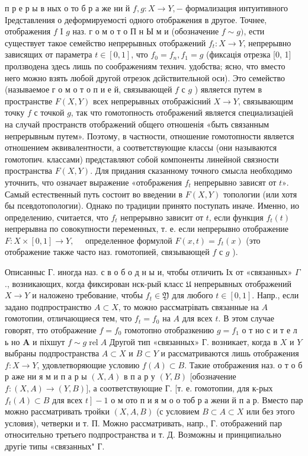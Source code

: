 \documentclass[10pt]{article}
\begin{document}
п р е р ы в ных о то б р а же ни й $f, g: X \rightarrow Y,-$ формализация интуитивного Іредставления о деформируемості одного отображения в другое. Точнее, отображения $f$ I $g$ наз. г о м о т $о$ П н Ы м и (обозначение $f \sim g)$, ести существует такое семейство непрерывных отображений $f_{t}: X \rightarrow Y$, непрерывно зависящих от параметра $t \in[0,1]$, что $f_{0}=f_{n}, f_{1}=g$ (фиксація отрезка [0, 1] пролзводена здесь лишь по соображениям технич. удобства; ясно, что вместо него можно взять любой другой отрезок дсйствительной оси). Это семейство (называемое г о м о т о п и е й, связывающей $f$ с $g$ ) является путем в пространстве $F(X, Y)$ всех непрерывных отображісний $X \rightarrow Y$, связывающим точку $f$ с точкой $g$, так что гомотопность отображений является специализаціей на случай пространств отображений общего отношенія «быть связанным непрерывным путем». Поэтому, в частности, отношение гомотопности является отношением әквивалентности, а соответствующие классы (они называются гомотопич. классами) представляют собой компоненты линейной связности пространства $F(X, Y)$. Для придания сказанному точного смысла необходимо уточнить, что означает выражение «отображения $f_{t}$ непрерывно зависят от $t »$. Самый естественный путь состоит во введении в $F(X, Y)$ топологии (или хотя бы псевдотопологии). Однако по традиции принято поступать иначе. Именно, ио определению, считается, что $f_{t}$ непрерывно зависит от $t$, если функция $f_{t}(t)$ непрерывна по совокупности переменных, т. е. если непрерывно отображение $F: X \times[0,1] \rightarrow Y, \quad$ определенное формулой $F(x, t)=f_{t}(x)$ (это отображение также часто наз. гомотопией, связывающей $f$ с $g$ ).



Описанныс Г. иногда наз. с в о б о д н ы и, чтобы отличить Іх от «связанных» $\Gamma$., возникающих, когда фиксирован нск-рый класс $\mathfrak{U}$ непрерывных отображений $X \rightarrow Y$ и наложено требование, чтобы $f_{t} \in \mathfrak{Y}$ для любого $t \in[0,1]$. Напр., если задано подпространство $A \subset X$, то можно рассматрівать связанные на $A$ гомотопии, отличающиеся тем, что $f_{t}=f_{0}$ на $A$ для всех $t$. В этом случае говорят, тто отображение $f=f_{0}$ гомотопно отобразкению $g=f_{1}$ о т но с и т е л ь но $\boldsymbol{A}$ и піхшут $f \sim g \operatorname{rel} A$ Другой тип «связанных» $Г$. возникает, когда в $X$ и $Y$ выбраны подпространства $A \subset X$ и $B \subset Y$ и рассматриваются лишь отображения $f: X \rightarrow Y$, удовлетворяющие условию $f(A) \subset B$. Такие отображения наз. о т о б р аже ни я м и п а р ы $(X, A)$ в п а р у $(Y, B)$ [обозначение $f:(X, A) \rightarrow(Y, B)]$, а соответствующие Г. [т. е. гомотопии, для к-рых $f_{t}(A) \subset B$ для всех $\left.t\right]-1$ о м ото п и я м о о тоб р а жени й п а р. Вместо пар можно рассматривать тройки $(X, A, B)$ (с условием $B \subset A \subset X$ или без этого условия), четверки и т. П. Можно рассматривать, напр., Г. отображений пар относительно третьего подпространства и т. Д. Возможны и принципиально другіе типы «связанных" $Г$.
\end{document}
